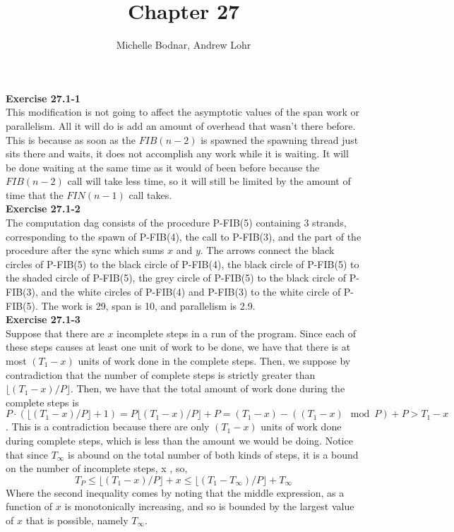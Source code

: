 \documentclass{article}
\title{Chapter 27}
\author{Michelle Bodnar, Andrew Lohr}
\begin{document}
\maketitle
\noindent\textbf{Exercise 27.1-1}\\

This modification is not going to affect the asymptotic values of the span work or parallelism. All it will do is add an amount of overhead that wasn't there before. This is because as soon as the $FIB(n-2)$ is spawned the spawning thread just sits there and waits, it does not accomplish any work while it is waiting. It will be done waiting at the same time as it would of been before because the $FIB(n-2)$ call will take less time, so it will still be limited by the amount of time that the $FIN(n-1)$ call takes.\\

\noindent\textbf{Exercise 27.1-2}\\

The computation dag consists of the procedure P-FIB(5) containing 3 strands, corresponding to the spawn of P-FIB(4), the call to P-FIB(3), and the part of the procedure after the sync which sums $x$ and $y$.  The arrows connect the black circles of P-FIB(5) to the black circle of P-FIB(4), the black circle of P-FIB(5) to the shaded circle of P-FIB(5), the grey circle of P-FIB(5) to the black circle of P-FIB(3), and the white circles of P-FIB(4) and P-FIB(3) to the white circle of P-FIB(5).  The work is 29, span is 10, and parallelism is 2.9.  \\

\noindent\textbf{Exercise 27.1-3}\\

Suppose that there are $x$ incomplete steps in a run of the program. Since each of these steps causes at least one unit of work to be done, we have that there is at most $(T_1-x)$ units of work done in the complete steps. Then, we suppose by contradiction that the number of complete steps is strictly greater than $\lfloor (T_1-x)/P\rfloor$. Then, we have that the total amount of work done during the complete steps is $P\cdot (\lfloor (T_1-x)/P\rfloor + 1) = P\lfloor (T_1-x)/P\rfloor +P =  (T_1-x) - ((T_1-x)\mod P) + P > T_1-x$. This is a contradiction because there are only $(T_1-x)$ units of work done during complete steps, which is less than the amount we would be doing. Notice that since $T_\infty$ is abound on the total number of both kinds of steps, it is a bound on the number of incomplete steps, x , so, 
\[
T_P \le \lfloor (T_1-x)/P\rfloor +x \le \lfloor (T_1-T_{\infty})/P\rfloor +T_{\infty} 
\]
Where the second inequality comes by noting that the middle expression, as a function of $x$ is monotonically increasing, and so is bounded by the largest value of $x$ that is possible, namely $T_{\infty}$.\\
\end{document}
